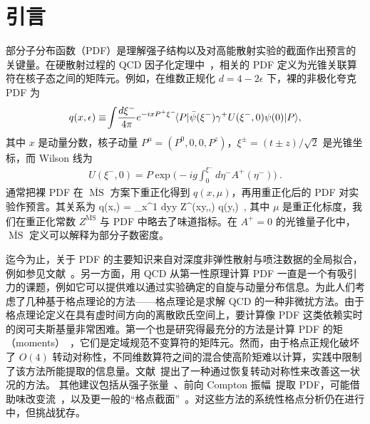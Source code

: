 \section{引言}

部分子分布函数（PDF）是理解强子结构以及对高能散射实验的截面作出预言的关键量。在硬散射过程的 QCD 因子化定理中~\cite{Collins:1989gx}，相关的 PDF 定义为光锥关联算符在核子态之间的矩阵元。例如，在维数正规化 $d=4-2\epsilon$ 下，裸的非极化夸克 PDF 为
\begin{align} \label{eq:lcpdf}
	q(x,\epsilon) \equiv\! \int\! {d\xi^-\over 4\pi} e^{-ixP^+\xi^-}\! \langle P | \bar{\psi}  (\xi^-) \gamma^+ U (\xi^-, 0) \psi (0) | P \rangle ,
\end{align}
其中 $x$ 是动量分数，核子动量 $P^\mu=(P^0,0,0,P^z)$，$\xi^{\pm}=(t\pm z)/\sqrt{2}$ 是光锥坐标，而 Wilson 线为
\begin{align}
	U(\xi^-,0) = P\exp\biggl(-ig\int_0^{\xi^-} d\eta^- A^+(\eta^-)\biggr)\ .
\end{align}
通常把裸 PDF 在 $\overline{\ensuremath{\operatorname{MS}}}$ 方案下重正化得到 $q(x,\mu)$，再用重正化后的 PDF 对实验作预言。其关系为
\beq
	q(x,\epsilon) = \int_x^1 {dy\over y}\:  Z^{}\Bigl({x\over y},\epsilon,\mu\Bigr) q(y,\mu)\ ,
\eeq
其中 $\mu$ 是重正化标度，我们在重正化常数 $Z^{\overline{\ensuremath{\operatorname{MS}}}}$ 与 PDF 中略去了味道指标。在 $A^+=0$ 的光锥量子化中，$\overline{\ensuremath{\operatorname{MS}}}$ 定义可以解释为部分子数密度。

迄今为止，关于 PDF 的主要知识来自对深度非弹性散射与喷注数据的全局拟合，例如参见文献~\cite{Ball:2014uwa,Dulat:2015mca,Martin:2009iq,Alekhin:2017kpj,Buckley:2014ana}。另一方面，用 QCD 从第一性原理计算 PDF 一直是一个有吸引力的课题，例如它可以提供难以通过实验确定的自旋与动量分布信息。为此人们考虑了几种基于格点理论的方法——格点理论是求解 QCD 的一种非微扰方法。由于格点理论定义在具有虚时间方向的离散欧氏空间上，要计算像 PDF 这类依赖实时的闵可夫斯基量非常困难。第一个也是研究得最充分的方法是计算 PDF 的矩（moments）~\cite{Martinelli:1987zd,Martinelli:1988xs,Detmold:2001dv,Detmold:2002nf,Dolgov:2002zm}，它们是定域规范不变算符的矩阵元。然而，由于格点正规化破坏了 $O(4)$ 转动对称性，不同维数算符之间的混合使高阶矩难以计算，实践中限制了该方法所能提取的信息量。文献~\cite{Davoudi:2012ya}提出了一种通过恢复转动对称性来改善这一状况的方法。
其他建议包括从强子张量~\cite{Liu:1993cv,Liu:1998um,Liu:1999ak,Liu:2016djw}、前向 Compton 振幅~\cite{Chambers:2017dov}提取 PDF，可能借助味改变流~\cite{Detmold:2005gg}，以及更一般的``格点截面''~\cite{Ma:2014jla,Ma:2017pxb}。对这些方法的系统性格点分析仍在进行中，但挑战犹存。

